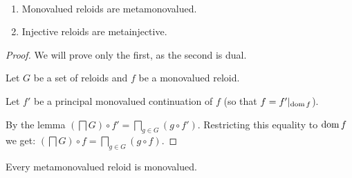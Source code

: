\begin{thm}\label{rld-meta}
~
\begin{enumerate}
\item Monovalued reloids are metamonovalued.
\item Injective reloids are metainjective.
\end{enumerate}
\end{thm}
\begin{proof}
We will prove only the first, as the second is dual.

Let $G$ be a set of reloids and $f$ be a monovalued reloid.

Let $f'$ be a principal monovalued continuation of $f$ (so that
$f=f'|_{\operatorname{dom} f}$).

By the lemma $\left(\bigsqcap G\right)\circ f'=\bigsqcap_{g\in G}(g\circ f')$.
Restricting this equality to $\operatorname{dom} f$ we get: $\left(\bigsqcap G\right)\circ f=\bigsqcap_{g\in G}(g\circ f)$.\end{proof}
\begin{conjecture}
Every metamonovalued reloid is monovalued.\end{conjecture}

